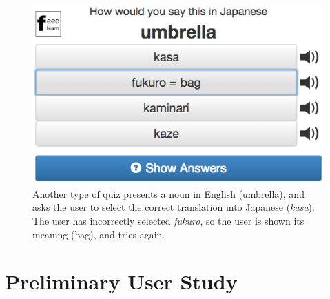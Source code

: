 \documentclass{chi-ext}
\begin{document}
\begin{figure}
\centering
\includegraphics[width=1.0\columnwidth]{quiz2}
\caption{Another type of quiz presents a noun in English (umbrella), and asks the user to select the correct translation into Japanese (\textit{kasa}). The user has incorrectly selected \textit{fukuro}, so the user is shown its meaning (bag), and tries again.}
\label{fig:quiz2}
\end{figure}




\section{Preliminary User Study}
\end{document}
